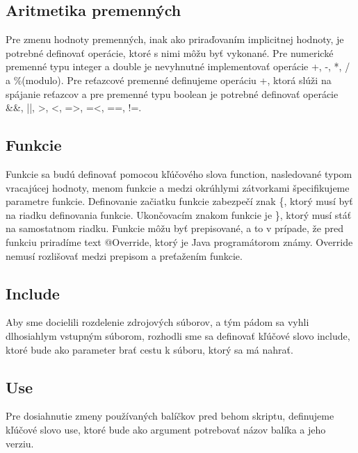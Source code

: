 \subsection{Aritmetika premenných}
\indent Pre zmenu hodnoty premenných, inak ako priraďovaním implicitnej hodnoty, je potrebné definovať operácie, ktoré s nimi môžu byť vykonané. Pre numerické premenné typu integer a double je nevyhnutné implementovať operácie +, -, *, / a \%(modulo). Pre reťazcové premenné definujeme operáciu +, ktorá slúži na spájanie reťazcov a pre premenné typu boolean je potrebné definovať operácie \&\&, ||, >, <, =>, =<, ==, !=.
\subsection{Funkcie}
\indent Funkcie sa budú definovať pomocou kľúčového slova function, nasledované typom vracajúcej hodnoty, menom funkcie a medzi okrúhlymi zátvorkami špecifikujeme parametre funkcie.
Definovanie začiatku funkcie zabezpečí znak \{, ktorý musí byť na riadku definovania funkcie. Ukončovacím znakom funkcie je \}, ktorý musí stáť na samostatnom riadku. Funkcie môžu byť prepisované, a to v prípade, že pred funkciu priradíme text @Override, ktorý je Java programátorom známy. Override nemusí rozlišovať medzi prepisom a preťažením funkcie. 
\subsection{Include}
\indent Aby sme docielili rozdelenie zdrojových súborov, a tým pádom sa vyhli dlhosiahlym vstupným súborom, rozhodli sme sa definovať kľúčové slovo include, ktoré bude ako parameter brať cestu k súboru, ktorý sa má nahrať. 
\subsection{Use}
\indent Pre dosiahnutie zmeny používaných balíčkov pred behom skriptu, definujeme kľúčové slovo use, ktoré bude ako argument potrebovať názov balíka a jeho verziu. 
